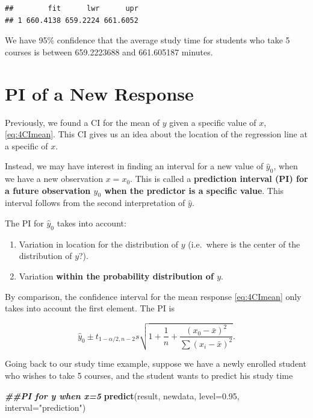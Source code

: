 \documentclass[
]{book}
\newenvironment{Shaded}{\begin{snugshade}}{\end{snugshade}}
\newcommand{\AttributeTok}[1]{\textcolor[rgb]{0.13,0.29,0.53}{#1}}
\newcommand{\DocumentationTok}[1]{\textcolor[rgb]{0.56,0.35,0.01}{\textbf{\textit{#1}}}}
\newcommand{\FloatTok}[1]{\textcolor[rgb]{0.00,0.00,0.81}{#1}}
\newcommand{\FunctionTok}[1]{\textcolor[rgb]{0.13,0.29,0.53}{\textbf{#1}}}
\newcommand{\NormalTok}[1]{#1}
\newcommand{\StringTok}[1]{\textcolor[rgb]{0.31,0.60,0.02}{#1}}
\providecommand{\tightlist}{%
  \setlength{\itemsep}{0pt}\setlength{\parskip}{0pt}}
\begin{document}
\begin{verbatim}
##        fit      lwr      upr
## 1 660.4138 659.2224 661.6052
\end{verbatim}

We have 95\% confidence that the average study time for students who take 5 courses is between 659.2223688 and 661.605187 minutes.

\hypertarget{pi-of-a-new-response}{%
\section{PI of a New Response}\label{pi-of-a-new-response}}

Previously, we found a CI for the mean of \(y\) given a specific value of \(x\), \eqref{eq:4CImean}. This CI gives us an idea about the location of the regression line at a specific of \(x\).

Instead, we may have interest in finding an interval for a new value of \(\hat{y}_0\), when we have a new observation \(x=x_0\). This is called a \textbf{prediction interval (PI) for a future observation \(y_0\) when the predictor is a specific value}. This interval follows from the second interpretation of \(\hat{y}\).

The PI for \(\hat{y}_0\) takes into account:

\begin{enumerate}
\def\labelenumi{\arabic{enumi}.}
\tightlist
\item
  Variation in location for the distribution of \(y\) (i.e.~where is the center of the distribution of \(y\)?).
\item
  Variation \textbf{within the probability distribution of \(y\)}.
\end{enumerate}

By comparison, the confidence interval for the mean response \eqref{eq:4CImean} only takes into account the first element. The PI is

\begin{equation} 
\hat{y}_0\pm t_{1-\alpha/2,n-2}s \sqrt{1+\frac{1}{n} +
\frac{(x_0-\bar{x})^2}{\sum(x_i-\bar{x})^2}}.
\label{eq:4pred}
\end{equation}

Going back to our study time example, suppose we have a newly enrolled student who wishes to take 5 courses, and the student wants to predict his study time

\begin{Shaded}
\begin{Highlighting}[]
\DocumentationTok{\#\#PI for y when x=5}
\FunctionTok{predict}\NormalTok{(result, newdata, }\AttributeTok{level=}\FloatTok{0.95}\NormalTok{, }\AttributeTok{interval=}\StringTok{"prediction"}\NormalTok{)}
\end{Highlighting}
\end{Shaded}
\end{document}
